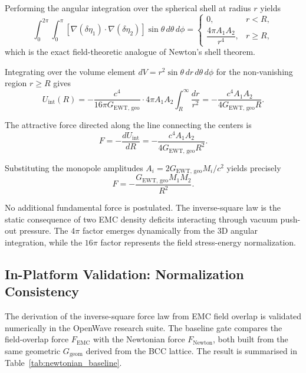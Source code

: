 \documentclass[10pt,a4paper]{article}
\begin{document}
Performing the angular integration over the spherical shell at radius $r$ yields
\begin{equation}
	\int_{0}^{2\pi}
	\int_{0}^{\pi}
	\left[ \nabla(\delta\eta_1) \cdot \nabla(\delta\eta_2) \right]
	\sin\theta
	\,d\theta
	\,d\phi
	=
	\begin{cases}
		0, & r < R, \\[4pt]
		\dfrac{4\pi A_1 A_2}{r^4}, & r \ge R,
	\end{cases}
\end{equation}
which is the exact field-theoretic analogue of Newton's shell theorem.

Integrating over the volume element $dV = r^2 \sin\theta \,dr \,d\theta \,d\phi$ for the non-vanishing region $r \ge R$ gives
\begin{equation}
	U_{\text{int}}(R)
	=
	-\frac{c^4}{16\pi G_{\text{EWT, geo}}}
	\cdot
	4\pi A_1 A_2
	\int_{R}^{\infty}
	\frac{dr}{r^{2}}
	=
	-\frac{c^4 A_1 A_2}{4 G_{\text{EWT, geo}} R}
	.
\end{equation}

The attractive force directed along the line connecting the centers is
\begin{equation}
	F
	=
	-\frac{dU_{\text{int}}}{dR}
	=
	-\frac{c^4 A_1 A_2}{4 G_{\text{EWT, geo}} R^{2}}
	.
\end{equation}

Substituting the monopole amplitudes $A_i = 2 G_{\text{EWT, geo}} M_i / c^2$ yields precisely
\begin{equation}
	F
	=
	-\frac{G_{\text{EWT, geo}} M_1 M_2}{R^{2}}
	.
\end{equation}

No additional fundamental force is postulated. The inverse-square law
is the static consequence of two EMC density deficits interacting
through vacuum push-out pressure. The \(4\pi\) factor emerges dynamically from the 3D angular integration, while the \(16\pi\) factor represents the field stress-energy normalization.

\subsection{In-Platform Validation: Normalization Consistency}
\label{sec:newtonian_force_validation}

The derivation of the inverse-square force law from EMC field overlap
is validated numerically in the OpenWave research suite. The baseline
gate compares the field-overlap force $F_{\text{EMC}}$ with the
Newtonian force $F_{\text{Newton}}$, both built from the same
geometric $G_{\text{geom}}$ derived from the BCC lattice. The result
is summarised in Table~\ref{tab:newtonian_baseline}.
\end{document}
